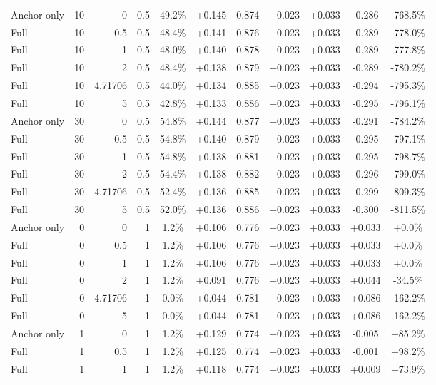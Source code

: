 \begin{table}[htbp]
\begin{tabular}{lrrrccccccc}
Anchor only & 10 & 0 & 0.5 & 49.2\% & +0.145 & 0.874 & +0.023 & +0.033 & -0.286 & -768.5\% \\
Full & 10 & 0.5 & 0.5 & 48.4\% & +0.141 & 0.876 & +0.023 & +0.033 & -0.289 & -778.0\% \\
Full & 10 & 1 & 0.5 & 48.0\% & +0.140 & 0.878 & +0.023 & +0.033 & -0.289 & -777.8\% \\
Full & 10 & 2 & 0.5 & 48.4\% & +0.138 & 0.879 & +0.023 & +0.033 & -0.289 & -780.2\% \\
Full & 10 & 4.71706 & 0.5 & 44.0\% & +0.134 & 0.885 & +0.023 & +0.033 & -0.294 & -795.3\% \\
Full & 10 & 5 & 0.5 & 42.8\% & +0.133 & 0.886 & +0.023 & +0.033 & -0.295 & -796.1\% \\
Anchor only & 30 & 0 & 0.5 & 54.8\% & +0.144 & 0.877 & +0.023 & +0.033 & -0.291 & -784.2\% \\
Full & 30 & 0.5 & 0.5 & 54.8\% & +0.140 & 0.879 & +0.023 & +0.033 & -0.295 & -797.1\% \\
Full & 30 & 1 & 0.5 & 54.8\% & +0.138 & 0.881 & +0.023 & +0.033 & -0.295 & -798.7\% \\
Full & 30 & 2 & 0.5 & 54.4\% & +0.138 & 0.882 & +0.023 & +0.033 & -0.296 & -799.0\% \\
Full & 30 & 4.71706 & 0.5 & 52.4\% & +0.136 & 0.885 & +0.023 & +0.033 & -0.299 & -809.3\% \\
Full & 30 & 5 & 0.5 & 52.0\% & +0.136 & 0.886 & +0.023 & +0.033 & -0.300 & -811.5\% \\
Anchor only & 0 & 0 & 1 & 1.2\% & +0.106 & 0.776 & +0.023 & +0.033 & +0.033 & +0.0\% \\
Full & 0 & 0.5 & 1 & 1.2\% & +0.106 & 0.776 & +0.023 & +0.033 & +0.033 & +0.0\% \\
Full & 0 & 1 & 1 & 1.2\% & +0.106 & 0.776 & +0.023 & +0.033 & +0.033 & +0.0\% \\
Full & 0 & 2 & 1 & 1.2\% & +0.091 & 0.776 & +0.023 & +0.033 & +0.044 & -34.5\% \\
Full & 0 & 4.71706 & 1 & 0.0\% & +0.044 & 0.781 & +0.023 & +0.033 & +0.086 & -162.2\% \\
Full & 0 & 5 & 1 & 0.0\% & +0.044 & 0.781 & +0.023 & +0.033 & +0.086 & -162.2\% \\
Anchor only & 1 & 0 & 1 & 1.2\% & +0.129 & 0.774 & +0.023 & +0.033 & -0.005 & +85.2\% \\
Full & 1 & 0.5 & 1 & 1.2\% & +0.125 & 0.774 & +0.023 & +0.033 & -0.001 & +98.2\% \\
Full & 1 & 1 & 1 & 1.2\% & +0.118 & 0.774 & +0.023 & +0.033 & +0.009 & +73.9\% \\

\end{tabular}
\end{table}
